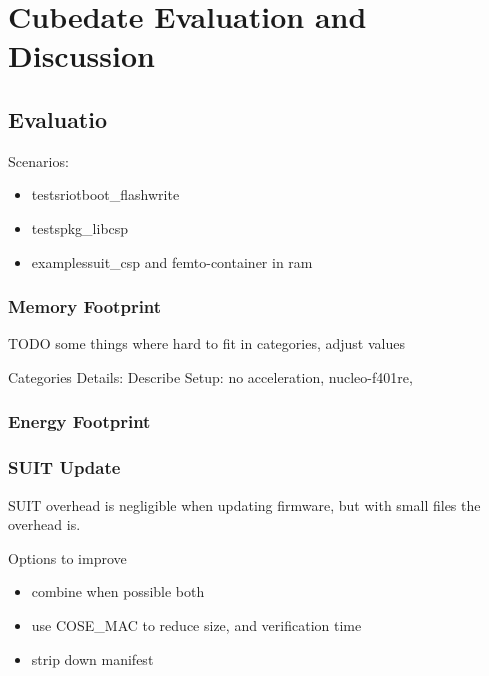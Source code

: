 \section{Cubedate Evaluation and Discussion}
\label{sec:evaluation}

\subsection{Evaluatio}

Scenarios:

\begin{itemize}
    \item tests\/riotboot\_flashwrite
    \item tests\/pkg\_libcsp
    \item examples\/suit\_csp and femto-container in ram
\end{itemize}


\subsubsection{Memory Footprint}

TODO some things where hard to fit in categories, adjust values

Categories Details:
Describe Setup: no acceleration, nucleo-f401re,




\subsubsection{Energy Footprint} 

\subsubsection{SUIT Update}

SUIT overhead is negligible when updating firmware, but with small files the overhead
is.

Options to improve

\begin{itemize}
    \item combine when possible both
    \item use COSE\_MAC to reduce size, and verification time
    \item strip down manifest
\end{itemize}

